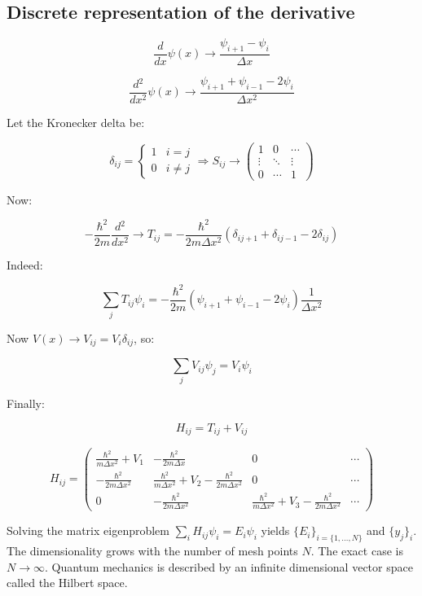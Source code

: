   \subsection{Discrete representation of the derivative}

  $$\frac{d{}}{d{x}}\psi(x) \rightarrow \frac{\psi_{i+1}-\psi_i}{\Delta x}$$

  $$\frac{d{^2}}{d{x^2}}\psi(x) \rightarrow \frac{\psi_{i+1}+\psi_{i-1}-2\psi_i}{\Delta x^2}$$

  Let the Kronecker delta be:

      $$\delta_{ij} =\begin{cases}1 &i=j\\0 &i\neq j\end{cases}\Rightarrow S_{ij} \rightarrow\begin{pmatrix}1 & 0 & \cdots\\\vdots & \ddots &\vdots \\0&\cdots & 1 \end{pmatrix}$$

  Now:

  $$-\frac{\hbar^2}{2m}\frac{d{^2}}{d{x^2}}\rightarrow T_{ij}=-\frac{\hbar^2}{2m\Delta x^2}(\delta_{ij+1}+\delta_{ij-1}-2\delta_{ij})$$

  Indeed:

  $$\sum\limits_{j}T_{ij}\psi_i = -\frac{\hbar^2}{2m}(\psi_{i+1}+\psi_{i-1}-2\psi_i)\frac{1}{\Delta x^2}$$

  Now $V(x) \rightarrow V_{ij} = V_i\delta_{ij}$, so:

  $$\sum\limits_{j}V_{ij}\psi_j = V_i\psi_i$$

  Finally:

  $$H_{ij} = T_{ij} + V_{ij}$$

  $$H_{ij} = \begin{pmatrix}\frac{\hbar^2}{m\Delta x^2} + V_1 & -\frac{\hbar^2}{2m\Delta x} & 0 & \cdots\\ -\frac{\hbar^2}{2m\Delta x^2} & \frac{\hbar^2}{m\Delta x^2}+V_2-\frac{\hbar^2}{2m \Delta x^2} & 0 & \cdots\\ 0 & -\frac{\hbar^2}{2m\Delta x^2} & \frac{\hbar^2}{m\Delta x^2}+V_3 - \frac{\hbar^2}{2m\Delta x^2} & \cdots\end{pmatrix}$$

  Solving the matrix eigenproblem $\sum\limits_i H_{ij}\psi_i = E_i\psi_i$ yields $\{E_i\}_{i=\{1,\dots,N\}}$ and $\{y_j\}_i$.
  The dimensionality grows with the number of mesh points $N$.
  The exact case is $N\rightarrow\infty$.
  Quantum mechanics is described by an infinite dimensional vector space called the Hilbert space.


